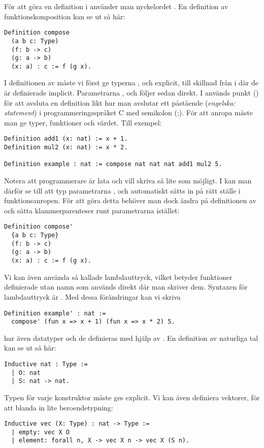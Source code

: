 För att göra en definition i \coq{} använder man nyckelordet . En
definition av funktionskomposition kan se ut så här:
\begin{lstlisting}
Definition compose
  (a b c: Type)
  (f: b -> c)
  (g: a -> b)
  (x: a) : c := f (g x).
\end{lstlisting}
I definitionen av  måste vi först ge typerna ,  och 
explicit, till skillnad från i \haskell{} där de är definierade implicit.
Parametrarna ,  och  följer sedan direkt. I \coq{} används punkt
() för att avsluta en definition likt hur man avslutar ett påstående
(\emph{engelska: statement}) i programmeringsspråket \textsc{C} med semikolon
(;). För att anropa  måste man ge typer, funktioner och värdet. Till
exempel:
\begin{lstlisting}
Definition add1 (x: nat) := x + 1.
Definition mul2 (x: nat) := x * 2.

Definition example : nat := compose nat nat nat add1 mul2 5.
\end{lstlisting}
Notera att programmerare är lata och vill skriva så lite som möjligt. I
\coq{} kan man därför se till att typ parametrarna ,  och 
automatiskt sätts in på rätt ställe i funktionsanropen. För att göra detta
behöver man dock ändra på definitionen av  och sätta
klammerparenteser runt parametrarna istället:
\begin{lstlisting}
Definition compose'
  {a b c: Type}
  (f: b -> c)
  (g: a -> b)
  (x: a) : c := f (g x).
\end{lstlisting}
Vi kan även använda så kallade lambdauttryck, vilket betyder funktioner
definierade utan namn som används direkt där man skriver dem. Syntaxen för
lambdauttryck är . Med dessa förändringar kan
vi skriva
\begin{lstlisting}
Definition example' : nat :=
  compose' (fun x => x + 1) (fun x => x * 2) 5.
\end{lstlisting}
\coq{} har även datatyper och de definieras med hjälp av . En
definition av naturliga tal kan se ut så här:
\begin{lstlisting}
Inductive nat : Type :=
  | O: nat
  | S: nat -> nat.
\end{lstlisting}
Typen för varje konstruktor måste ges explicit. Vi kan även definiera vektorer, för
att blanda in lite beroendetypning:
\begin{lstlisting}
Inductive vec (X: Type) : nat -> Type :=
  | empty: vec X O
  | element: forall n, X -> vec X n -> vec X (S n).
\end{lstlisting}
